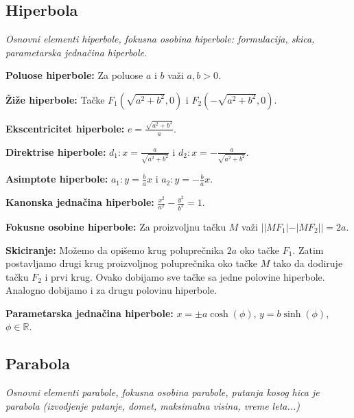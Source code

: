 \documentclass[12pt]{article}
\begin{document}
\subsection{Hiperbola}
\textit{Osnovni elementi hiperbole, fokusna osobina hiperbole: formulacija,
    skica, parametarska jednačina hiperbole.}
\par
\vspace*{1cm}

\textbf{Poluose hiperbole:} Za poluose $a$ i $b$ važi $a,b>0$.
\par

\textbf{Žiže hiperbole:} Tačke $F_1(\sqrt{a^2+b^2},0)$ i $F_2(-\sqrt{a^2+b^2},0)$.
\par

\textbf{Ekscentricitet hiperbole:} $e=\frac{\sqrt{a^2+b^2}}{a}$.
\par

\textbf{Direktrise hiperbole:} $d_1: x=\frac{a}{\sqrt{a^2+b^2}}$ i
$d_2: x=-\frac{a}{\sqrt{a^2+b^2}}$.
\par

\textbf{Asimptote hiperbole:} $a_1: y=\frac{b}{a}x$ i
$a_2: y=-\frac{b}{a}x$.
\par

\textbf{Kanonska jednačina hiperbole:} $\frac{x^2}{a^2}-\frac{y^2}{b^2}=1$.
\par

\textbf{Fokusne osobine hiperbole:} Za proizvoljnu tačku $M$ važi
$||MF_1|-|MF_2||=2a$.
\par

\textbf{Skiciranje:} Možemo da opišemo krug poluprečnika $2a$ oko tačke $F_1$.
Zatim postavljamo drugi krug proizvoljnog poluprečnika oko tačke $M$ tako da
dodiruje tačku $F_2$ i prvi krug. Ovako dobijamo sve tačke sa jedne polovine
hiperbole. Analogno dobijamo i za drugu polovinu hiperbole.
\par

\textbf{Parametarska jednačina hiperbole:} $x=\pm a\cosh(\phi)$, $y=b\sinh(\phi)$,
$\phi\in\mathbb{R}$.

\subsection{Parabola}
\textit{Osnovni elementi parabole, fokusna osobina parabole, putanja kosog hica
    je parabola (izvodjenje putanje, domet, maksimalna visina, vreme leta...)}
\par
\vspace*{1cm}
\end{document}
